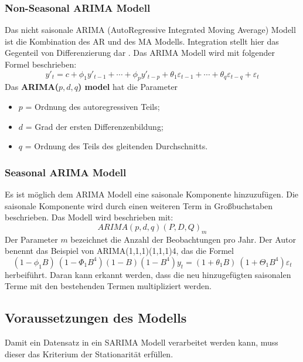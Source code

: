\documentclass[12pt]{report}
\begin{document}
	\subsubsection{Non-Seasonal ARIMA Modell}
	Das nicht saisonale ARIMA (AutoRegressive Integrated Moving Average) Modell ist die Kombination des AR und des MA Modells. Integration stellt hier das Gegenteil von Differenzierung dar \cite[Kapitel 8.5]{Hyndman.May2018}. Das ARIMA Modell wird mit folgender Formel beschrieben:
	\begin{equation}
		y'_{t} = c + \phi_{1}y'_{t-1} + \cdots + \phi_{p}y'_{t-p} + \theta_{1}\varepsilon_{t-1} + \cdots + \theta_{q}\varepsilon_{t-q} + \varepsilon_{t}
	\end{equation}
	Das \textbf{ARIMA($p,d,q$) model} hat die Parameter
	\begin{itemize}
		\item $p$ = Ordnung des autoregressiven Teils;
		\item $d$ = Grad der ersten Differenzenbildung;
		\item $q$ =	Ordnung des Teils des gleitenden Durchschnitts.
	\end{itemize}
	\subsubsection{Seasonal ARIMA Modell}
	Es ist möglich dem ARIMA Modell eine saisonale Komponente hinzuzufügen. Die saisonale Komponente wird durch einen weiteren Term in Großbuchstaben beschrieben. 
	Das Modell wird beschrieben mit:	
	\begin{equation}
		ARIMA (p, d, q) (P, D, Q)_m
	\end{equation}
	Der Parameter $m$ bezeichnet die Anzahl der Beobachtungen pro Jahr. Der Autor \cite[Kapitel 8.9]{Hyndman.May2018} benennt das Beispiel von ARIMA(1,1,1)(1,1,1)4, das die Formel 
	\begin{equation}
		(1 - \phi_{1}B)~(1 - \Phi_{1}B^{4}) (1 - B) (1 - B^{4})y_{t} =
		(1 + \theta_{1}B)~ (1 + \Theta_{1}B^{4})\varepsilon_{t}
	\end{equation}
	herbeiführt. Daran kann erkannt werden, dass die neu hinzugefügten saisonalen Terme mit den bestehenden Termen multipliziert werden. 
	
	\subsection{Voraussetzungen des Modells}
	Damit ein Datensatz in ein SARIMA Modell verarbeitet werden kann, muss dieser das Kriterium der Stationarität erfüllen. 
\end{document}
